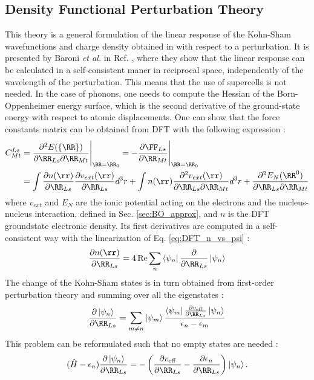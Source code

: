 \subsection{Density Functional Perturbation Theory} \label{sec:DFPT}
This theory is a general formulation of the linear response of the Kohn-Sham wavefunctions and charge density obtained in  with respect to a perturbation. It is presented by Baroni \textit{et al.} in Ref. \cite{baroni2001phonons}, where they show that the linear response can be calculated in a self-consistent maner in reciprocal space, independently of the wavelength of the perturbation. This means that the use of supercells is not needed. In the case of phonons, one needs to compute the Hessian of the Born-Oppenheimer energy surface, which is the second derivative of the ground-state energy with respect to atomic displacements. One can show that the force constants matrix can be obtained from \acrshort{DFT} with the following expression \cite{gonze1997dynamical} :
\begin{align}
\begin{split}
	C^{Ls}_{Mt} &= \frac{\partial^2 E(\{\RR\})}{\partial\RR_{Ls} \partial \RR_{Mt}} \Biggr|_{\RR=\RR_0} = - \frac{\partial \FF_{Ls}}{\partial \RR_{Mt}} \Biggr|_{\RR=\RR_0} \\
	&= \int \frac{\partial n(\rr)}{\partial \RR_{Ls}} \frac{\partial v_{ext}(\rr)}{\partial \RR_{Ls}} d^3r + \int n(\rr) \frac{\partial^2 v_{ext}(\rr)}{\partial \RR_{Ls} \partial \RR_{Mt}} d^3r + \frac{\partial^2 E_N(\RR^0) }{\partial \RR_{Ls} \partial \RR_{Mt}}
\end{split}
\end{align}
where $v_{ext}$ and $E_N$ are the ionic potential acting on the electrons and the nucleus-nucleus interaction, defined in Sec. \ref{sec:BO_approx}, and $n$ is the \acrshort{DFT} groundstate electronic density. Its first derivatives are computed in a self-consistent way with the linearization of Eq. \eqref{eq:DFT_n_vs_psi} :
\begin{equation}
	\frac{\partial n(\rr)}{\partial \RR_{Ls}} = 4\Re \sum_n \bra{\psi_n} \frac{\partial}{\partial \RR_{Ls}} \ket{\psi_n}
\end{equation}
The change of the Kohn-Sham states is in turn obtained from first-order perturbation theory and summing over all the eigenstates :
\begin{equation}
	\frac{\partial\ket{\psi_n}}{\partial \RR_{Ls}} = \sum_{m\neq n} \ket{\psi_m} \frac{\bra{\psi_m} \tfrac{\partial v_{\text{eff}}}{\partial\RR_{Ls}}\ket{\psi_n}}{\epsilon_n - \epsilon_m}
\end{equation}
This problem can be reformulated such that no empty states are needed :
\begin{equation}
	(\hat{H} - \epsilon_n) \frac{\partial\ket{\psi_n}}{\partial \RR_{Ls}} = - \left(\frac{\partial v_{\text{eff}}}{\partial\RR_{Ls}} - \frac{\partial \epsilon_n}{\partial\RR_{Ls}}  \right) \ket{\psi_n}.
\end{equation}


